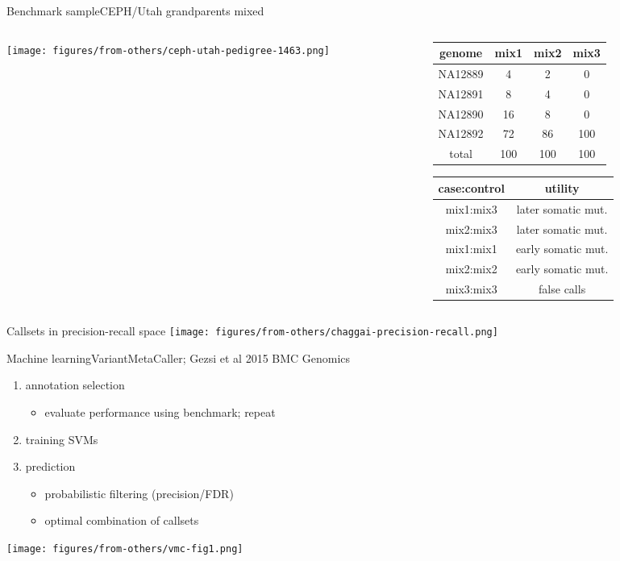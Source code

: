 \documentclass{beamer}
\begin{document}
\begin{frame}{Benchmark sample}{CEPH/Utah grandparents mixed}
\begin{center}
\begin{columns}[t]
\begin{column}{0.5\textwidth}

\texttt{[image: figures/from-others/ceph-utah-pedigree-1463.png]}
\end{column}

\begin{column}{0.5\textwidth}

\small
{
\begin{tabular}{cccc}
genome & mix1 & mix2 & mix3\\
\hline
NA12889 & 4 & 2 & 0\\
NA12891 & 8 & 4 & 0\\
NA12890 & 16 & 8 & 0\\
NA12892 & 72 & 86 & 100\\
\hline
total & 100 & 100 & 100\\
\end{tabular}
}
\vfill
{
\begin{tabular}{cc}
case:control & utility \\
\hline
\hline
mix1:mix3 & later somatic mut. \\
mix2:mix3 & later somatic mut. \\
\hline
mix1:mix1 & early somatic mut. \\
mix2:mix2 & early somatic mut. \\
\hline
mix3:mix3 & false calls \\
\end{tabular}
}
\end{column}
\end{columns}
\end{center}
\end{frame}

\begin{frame}{Callsets in precision-recall space}
\texttt{[image: figures/from-others/chaggai-precision-recall.png]}
\end{frame}

\begin{frame}{Machine learning}{VariantMetaCaller; Gezsi et al 2015 BMC Genomics}
\begin{enumerate}
\item annotation selection
\begin{itemize}
\item evaluate performance using benchmark; repeat
\end{itemize}
\item training SVMs
\begin{itemize}
\end{itemize}
\item prediction  
\begin{itemize}
\item probabilistic filtering (precision/FDR)
\item optimal combination of callsets
\end{itemize}
\end{enumerate}
\texttt{[image: figures/from-others/vmc-fig1.png]}
\end{frame}
\end{document}

